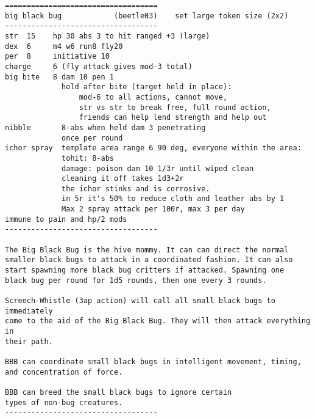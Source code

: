 \goodbreak \begin{samepage} \small \begin{verbatim}
===================================
big black bug            (beetle03)    set large token size (2x2)
-----------------------------------
str  15    hp 30 abs 3 to hit ranged +3 (large)
dex  6     m4 w6 run8 fly20
per  8     initiative 10
charge     6 (fly attack gives mod-3 total)
big bite   8 dam 10 pen 1
             hold after bite (target held in place):
                 mod-6 to all actions, cannot move,
                 str vs str to break free, full round action,
                 friends can help lend strength and help out
nibble       8-abs when held dam 3 penetrating
             once per round
ichor spray  template area range 6 90 deg, everyone within the area:
             tohit: 8-abs
             damage: poison dam 10 1/3r until wiped clean
             cleaning it off takes 1d3+2r
             the ichor stinks and is corrosive.
             in 5r it's 50% to reduce cloth and leather abs by 1
             Max 2 spray attack per 100r, max 3 per day
immune to pain and hp/2 mods
-----------------------------------

The Big Black Bug is the hive mommy. It can can direct the normal
smaller black bugs to attack in a coordinated fashion. It can also
start spawning more black bug critters if attacked. Spawning one
black bug per round for 1d5 rounds, then one every 3 rounds.

Screech-Whistle (3ap action) will call all small black bugs to immediately
come to the aid of the Big Black Bug. They will then attack everything in
their path.

BBB can coordinate small black bugs in intelligent movement, timing,
and concentration of force.

BBB can breed the small black bugs to ignore certain
types of non-bug creatures.
-----------------------------------
\end{verbatim} \normalsize \end{samepage}

\

